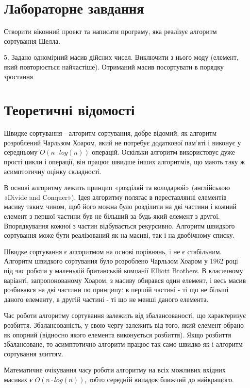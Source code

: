 \documentclass{article}
\begin{document}
\begin{normalsize}
		\section*{Лабораторне завдання}
		Створити віконний проект та написати програму, яка реалізує алгоритм сортування Шелла.
		\begin{center}
			5. Задано одномірний масив дійсних чисел. Виключити з нього моду (елемент, який повторюється найчастіше). Отриманий масив посортувати в порядку зростання
		\end{center}
		
		\section*{Теоретичні відомості}
		Швидке сортування - алгоритм сортування, добре відомий, як алгоритм розроблений Чарльзом Хоаром, який не потребує додаткової пам’яті і виконує у середньому $O(n\cdot log(n))$ операцій. Оскільки алгоритм використовує дуже прості цикли і операції, він працює швидше інших алгоритмів, що мають таку ж асимптотичну оцінку складності.
		
		В основі алгоритму лежить принцип «розділяй та володарюй» (англійською «Divide and Conquer»). Ідея алгоритму полягає в переставлянні елементів масиву таким чином, щоб його можна було розділити на дві частини і кожний елемент з першої частини був не більший за будь-який елемент з другої. Впорядкування кожної з частин відбувається рекурсивно. Алгоритм швидкого сортування може бути реалізований як на масиві, так і на двобічному списку.
		
		Швидке сортування є алгоритмом на основі порівнянь, і не є стабільним.
		Алгоритм швидкого сортування було розроблено Чарльзом Хоаром у 1962 році під час роботи у маленькій британській компанії Elliott Brothers.
		В класичному варіанті, запропонованому Хоаром, з масиву обирався один елемент, і весь масив розбивався на дві частини по принципу: в першій частині - ті що не більші даного елементу, в другій частині - ті що не менші даного елемента.
		
		Час роботи алгоритму сортування залежить від збалансованості, що характеризує розбиття. Збалансованість, у свою чергу залежить від того, який елемент обрано як опорний (відносно якого елемента виконується розбиття). Якщо розбиття збалансоване, то асимптотично алгоритм працює так само швидко як і алгоритм сортування злиттям. 
		
		Математичне очікування часу роботи алгоритму на всіх можливих вхідних масивах є $O(n\cdot log(n))$, тобто середній випадок ближчий до найкращого.
		

\end{normalsize}
\end{document}
